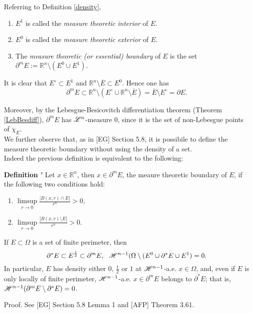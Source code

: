 \begin{definition} \label{measuretheorintext} Referring to Definition \ref{density},
\begin{enumerate}
	\item $E^{1}$ is called the {\em measure theoretic interior} of $E$.
	\item $E^{0}$ is called the {\em measure theoretic exterior} of $E$.
	\item The {\em measure theoretic (or essential) boundary} of $E$ is the set $\partial^{m}E := \mathbb{R}^{n} \setminus (E^{0} \cup E^{1})$.
\end{enumerate}
\end{definition}

\begin{remark} \label{essboundnull} It is clear that $E^{\circ} \subset E^{1}$ and $\mathbb{R}^{n} \setminus \overline E \subset E^{0}$. Hence one has 
\[ \partial^{m}E \subset \mathbb{R}^{n} \setminus (E^{\circ} \cup \mathbb{R}^{n} \setminus \overline E) = \overline E \setminus E^{\circ} = \partial E. \]

Moreover, by the Lebesgue-Besicovitch differentiation theorem (Theorem \ref{LebBesdiff}), $\partial^{m} E$ has $\mathscr{L}^{n}$-measure $0$, since it is the set of non-Lebesgue points of $\chi_{E}$.
\\

We further observe that, as in [EG] Section 5.8, it is possibile to define the measure theoretic boundary without using the density of a set.
\\
Indeed the previous definition is equivalent to the following:

\textbf{Definition \label{measuretheorintext}'} Let $x \in \mathbb{R}^{n}$, then $x \in \partial^{m}E$, the meaure theoretic boundary of $E$, if the following two conditions hold:
\begin{enumerate}
	\item $\displaystyle \limsup\limits_{r \to 0} \frac{|B(x,r) \cap E|}{r^{n}} > 0,$
	\item $\displaystyle \limsup\limits_{r \to 0} \frac{|B(x,r) \setminus E|}{r^{n}} > 0.$
\end{enumerate}
\end{remark}

\begin{theorem} \label{structhm2} If $E \subset \Omega$ is a set of finite perimeter, then
\[ \partial^{*}E \subset E^{\frac{1}{2}} \subset \partial^{m}E, \  \ \mathscr{H}^{n-1}(\Omega \setminus (E^{0} \cup \partial^{*}E \cup E^{1}) = 0. \]
In particular, $E$ has density either $0$, $\frac{1}{2}$ or $1$ at $\mathscr{H}^{n-1}$-a.e. $x \in \Omega$, and, even if $E$ is only locally of finite perimeter, $\mathscr{H}^{n-1}$-a.e. $x \in \partial^{m}E$ belongs to $\partial^{*}E$; that is, $\mathscr{H}^{n-1}(\partial^{m}E \setminus \partial^{*}E) = 0$.
\end{theorem}
Proof. See [EG] Section 5.8 Lemma 1 and [AFP] Theorem 3.61.


